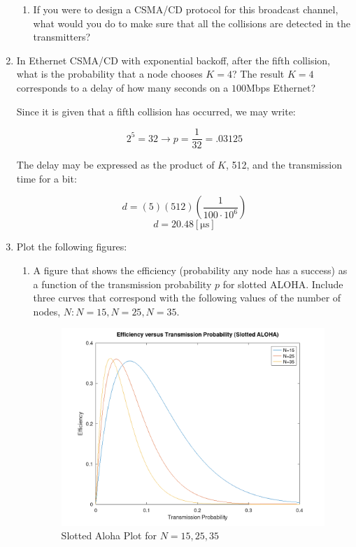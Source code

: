 \begin{enumerate}
\begin{enumerate}
        \item If you were to design a CSMA/CD protocol for this broadcast channel, what would you do to make sure that all the collisions are detected in the transmitters?

       \end{enumerate}

    \item In Ethernet CSMA/CD with exponential backoff, after the fifth collision, what is the probability that a node chooses $K = 4$? The result $K = 4$ corresponds to a delay of how many seconds on a $100$Mbps Ethernet?

      Since it is given that a fifth collision has occurred, we may write:

      $$\boxed{2^5=32\to p=\frac{1}{32}=.03125}$$

      The delay may be expressed as the product of $K$, 512, and the transmission time for a bit:

      $$d=(5)(512)\left( \frac{1}{100\cdot10^6} \right)$$
      $$\boxed{d=20.48[\si{\micro\second}]}$$

    \item Plot the following figures:

      \begin{enumerate}

          \item A figure that shows the efficiency (probability any node has a success) as a function of the transmission probability $p$ for slotted ALOHA. Include three curves that correspond with the following values of the number of nodes, $N: N=15,N=25, N=35$.

            \begin{figure}[H]
              \centering
              \includegraphics[width=.7\textwidth]{Figures/SlottedAloha.png}
              \caption{Slotted Aloha Plot for $N=15,25,35$}
              \label{fig:1}
            \end{figure}


\end{enumerate}
\end{enumerate}
